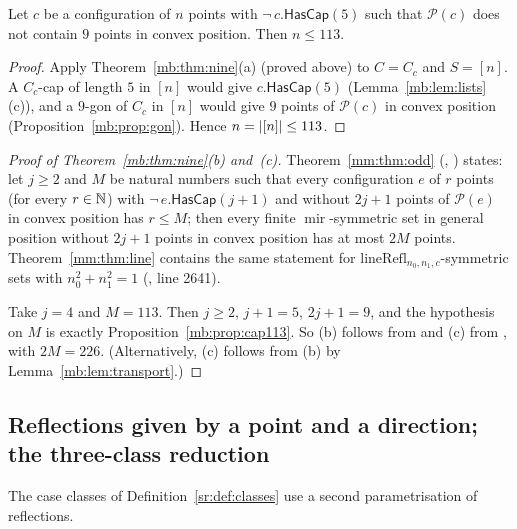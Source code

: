 \begin{proposition}\label{mb:prop:cap113}
Let $c$ be a configuration of $n$ points with $\neg\,c.\mathsf{HasCap}(5)$ such that $\mathcal P(c)$ does not contain $9$
points in convex position. Then $n\le113$.
\end{proposition}

\begin{proof}
Apply Theorem~\ref{mb:thm:nine}(a) (proved above) to $C=C_c$ and $S=[n]$. A $C_c$-cap of length $5$ in $[n]$ would give
$c.\mathsf{HasCap}(5)$ (Lemma~\ref{mb:lem:lists}(c)), and a $9$-gon of $C_c$ in $[n]$ would give $9$ points of
$\mathcal P(c)$ in convex position (Proposition~\ref{mb:prop:gon}). Hence $n=\lvert[n]\rvert\le113$.
\end{proof}

\begin{proof}[Proof of Theorem~\ref{mb:thm:nine}(b) and~(c)]
Theorem~\ref{mm:thm:odd} (, ) states: let $j\ge2$ and
$M$ be natural numbers such that every configuration $e$ of $r$ points (for every $r\in\mathbb N$) with
$\neg\,e.\mathsf{HasCap}(j+1)$ and without $2j+1$ points of $\mathcal P(e)$ in convex position has $r\le M$; then every
finite $\operatorname{mir}$-symmetric set in general position without $2j+1$ points in convex position has at most $2M$
points. Theorem~\ref{mm:thm:line} contains the same statement for $\mathrm{lineRefl}_{n_0,n_1,c}$-symmetric sets with
$n_0^2+n_1^2=1$ (, line 2641).

Take $j=4$ and $M=113$. Then $j\ge2$, $j+1=5$, $2j+1=9$, and the hypothesis on $M$ is exactly
Proposition~\ref{mb:prop:cap113}. So (b) follows from  and (c) from
, with $2M=226$. (Alternatively, (c) follows from (b) by Lemma~\ref{mb:lem:transport}.)
\end{proof}

\subsection{Reflections given by a point and a direction; the three-class reduction}\label{mb:ssec:three}

The case classes of Definition~\ref{sr:def:classes} use a second parametrisation of reflections.

